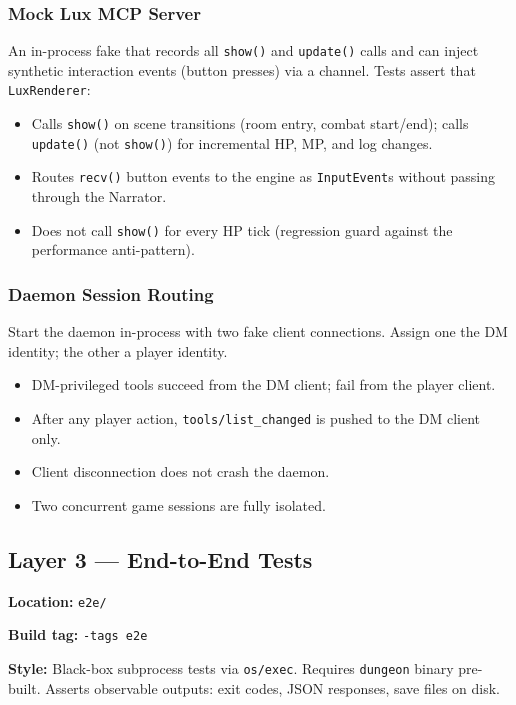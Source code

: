 \documentclass[a4paper,10pt]{article}
\newcommand{\tool}[1]{\texttt{#1}}
\newcommand{\cmd}[1]{\texttt{#1}}
\begin{document}
\subsubsection{Mock Lux MCP Server}

An in-process fake that records all \tool{show()} and
\tool{update()} calls and can inject synthetic interaction events
(button presses) via a channel.  Tests assert that
\texttt{LuxRenderer}:

\begin{itemize}
  \item Calls \tool{show()} on scene transitions (room entry, combat
    start/end); calls \tool{update()} (not \tool{show()}) for
    incremental HP, MP, and log changes.
  \item Routes \tool{recv()} button events to the engine as
    \texttt{InputEvent}s without passing through the Narrator.
  \item Does not call \tool{show()} for every HP tick (regression
    guard against the performance anti-pattern).
\end{itemize}

\subsubsection{Daemon Session Routing}

Start the daemon in-process with two fake client connections.
Assign one the DM identity; the other a player identity.

\begin{itemize}
  \item DM-privileged tools succeed from the DM client; fail from
    the player client.
  \item After any player action, \texttt{tools/list\_changed} is
    pushed to the DM client only.
  \item Client disconnection does not crash the daemon.
  \item Two concurrent game sessions are fully isolated.
\end{itemize}

\subsection{Layer 3 --- End-to-End Tests}

\textbf{Location:} \texttt{e2e/}

\textbf{Build tag:} \texttt{-tags e2e}

\textbf{Style:} Black-box subprocess tests via \texttt{os/exec}.
Requires \cmd{dungeon} binary pre-built.  Asserts observable
outputs: exit codes, JSON responses, save files on disk.
\end{document}
